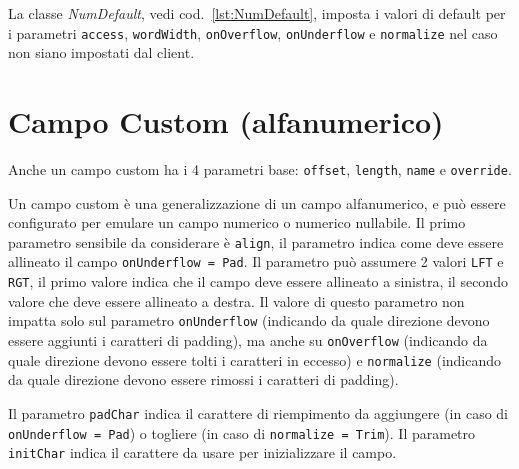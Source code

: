 \documentclass[a4paper,10pt]{report}
\begin{document}
La classe \textsl{NumDefault}, vedi cod.~\ref{lst:NumDefault}, imposta i valori
di default per i parametri \verb!access!, \verb!wordWidth!, \texttt{onOver\-flow}, 
\verb!onUnderflow! e \verb!normalize! nel caso non siano  impostati dal client.


\section{Campo Custom (alfanumerico)}
Anche un campo custom ha i 4 parametri base: \verb!offset!, \verb!length!,
\verb!name! e \verb!override!.

Un campo custom è una generalizzazione di un campo alfanumerico, e può essere 
configurato per emulare un campo numerico o numerico nullabile.
Il primo parametro sensibile da considerare è \verb!align!, il parametro indica
come deve essere allineato il campo \texttt{onUnderflow = Pad}.
Il parametro può assumere 2 valori \verb!LFT! e \verb!RGT!, il primo valore 
indica che il campo deve essere allineato a sinistra, il secondo valore che 
deve essere allineato a destra.
Il valore di questo parametro non impatta solo sul parametro \verb!onUnderflow!
(indicando da quale direzione devono essere aggiunti i caratteri di padding),
ma anche su \verb!onOverflow! (indicando da quale direzione devono essere tolti
i caratteri in eccesso) e \verb!normalize! (indicando da quale direzione devono
essere rimossi i caratteri di padding).

Il parametro \verb!padChar! indica il carattere di riempimento da aggiungere
(in caso di \texttt{onUnderflow = Pad}) o togliere (in caso di 
\texttt{normalize = Trim}).
Il parametro \verb!initChar! indica il carattere da usare per inizializzare il
campo.
\end{document}
